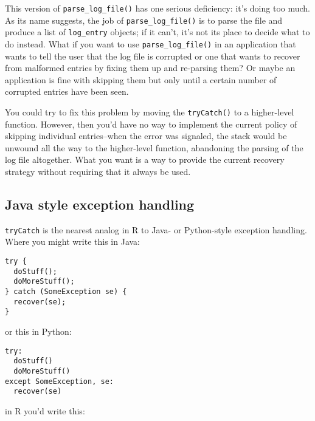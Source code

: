 This version of \texttt{parse\_log\_file()} has one serious deficiency:
it's doing too much. As its name suggests, the job of
\texttt{parse\_log\_file()} is to parse the file and produce a list of
\texttt{log\_entry} objects; if it can't, it's not its place to decide
what to do instead. What if you want to use \texttt{parse\_log\_file()}
in an application that wants to tell the user that the log file is
corrupted or one that wants to recover from malformed entries by fixing
them up and re-parsing them? Or maybe an application is fine with
skipping them but only until a certain number of corrupted entries have
been seen.

You could try to fix this problem by moving the \texttt{tryCatch()} to a
higher-level function. However, then you'd have no way to implement the
current policy of skipping individual entries--when the error was
signaled, the stack would be unwound all the way to the higher-level
function, abandoning the parsing of the log file altogether. What you
want is a way to provide the current recovery strategy without requiring
that it always be used.

\hypertarget{java-style-exception-handling}{%
\subsection{Java style exception
handling}\label{java-style-exception-handling}}

\texttt{tryCatch} is the nearest analog in R to Java- or Python-style
exception handling. Where you might write this in Java:

\begin{verbatim}
try {
  doStuff();
  doMoreStuff();
} catch (SomeException se) {
  recover(se);
}
\end{verbatim}

or this in Python:

\begin{verbatim}
try:
  doStuff()
  doMoreStuff()
except SomeException, se:
  recover(se)
\end{verbatim}

in R you'd write this:

\begin{Shaded}
\begin{Highlighting}[]
\NormalTok{(\{}
  \NormalTok{()}
  \NormalTok{()}
\NormalTok{\}, } 
\NormalTok{\})}
\end{Highlighting}
\end{Shaded}

